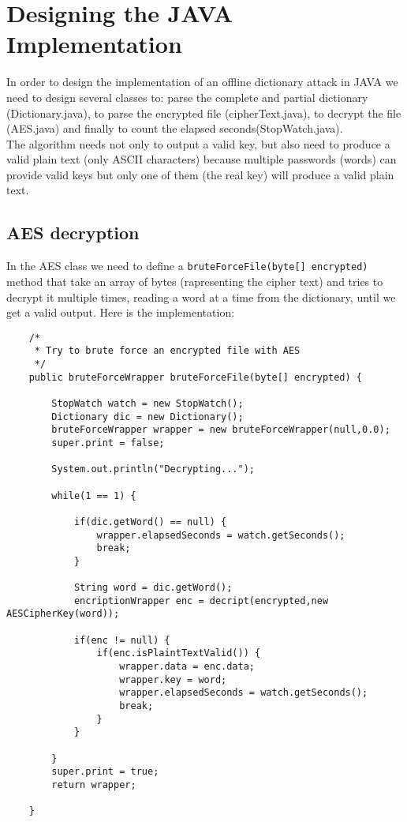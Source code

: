 \documentclass{article}
\begin{document}
\section{Designing the JAVA Implementation}
In order to design the implementation of an offline dictionary attack in JAVA we need to design several classes to: parse the complete and partial dictionary (Dictionary.java), to parse the encrypted file (cipherText.java), to decrypt the file (AES.java) and finally to count the elapsed seconds(StopWatch.java).\\
The algorithm needs not only to output a valid key, but also need to produce a valid plain text (only ASCII characters) because multiple passwords (words) can provide valid keys but only one of them (the real key) will produce a valid plain text.\\

\subsection{AES decryption}
In the AES class we need to define a \verb|bruteForceFile(byte[] encrypted)| method that take an array of bytes (rapresenting the cipher text) and tries to decrypt it multiple times, reading a word at a time from the dictionary, until we get a valid output. Here is the implementation:\\

	\begin{verbatim}
	/*
	 * Try to brute force an encrypted file with AES
	 */
	public bruteForceWrapper bruteForceFile(byte[] encrypted) {
		
		StopWatch watch = new StopWatch();
		Dictionary dic = new Dictionary();
		bruteForceWrapper wrapper = new bruteForceWrapper(null,0.0);
		super.print = false;
		
		System.out.println("Decrypting...");
		
		while(1 == 1) {
		
			if(dic.getWord() == null) {
				wrapper.elapsedSeconds = watch.getSeconds();
				break;
			}
			
			String word = dic.getWord();
			encriptionWrapper enc = decript(encrypted,new AESCipherKey(word));
			
			if(enc != null) {
				if(enc.isPlaintTextValid()) {
					wrapper.data = enc.data;
					wrapper.key = word;
					wrapper.elapsedSeconds = watch.getSeconds();
					break;
				}
			}
				
		}
		super.print = true;
		return wrapper;
	
	}	
	\end{verbatim}
\end{document}
